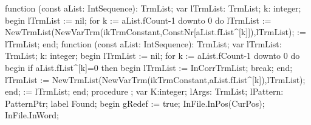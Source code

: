 \nwenddocs{}\endmoddef\nwstartdeflinemarkup{}\nwenddeflinemarkup
function (const aList: IntSequence): TrmList;
var
   lTrmList: TrmList;
   k: integer;
begin
   lTrmList := nil;
   for k := aList.fCount-1 downto 0 do
      lTrmList := NewTrmList(NewVarTrm(ikTrmConstant,ConstNr[aList.fList^[k]]),lTrmList);
    := lTrmList;
end;
\eatline
{}\nwendcode{}\nwdocspar
\nwenddocs{}\endmoddef\nwstartdeflinemarkup{}\nwenddeflinemarkup
function (const aList: IntSequence): TrmList;
var
   lTrmList: TrmList;
   k: integer;
begin
   lTrmList := nil;
   for k := aList.fCount-1 downto 0 do
   begin
      if aList.fList^[k]=0 then
      begin
         lTrmList := InCorrTrmList;
         break;
      end;
      lTrmList := NewTrmList(NewVarTrm(ikTrmConstant,aList.fList^[k]),lTrmList);
   end;
    := lTrmList;
end;
\eatline
{}\nwendcode{}\nwdocspar
\nwenddocs{}\endmoddef\nwstartdeflinemarkup{}\nwenddeflinemarkup
procedure ;
var
   K:integer;
   lArgs: TrmList;
   lPattern: PatternPtr;
label Found;
begin
   gRedef := true;
   InFile.InPos(CurPos);
   InFile.InWord;
